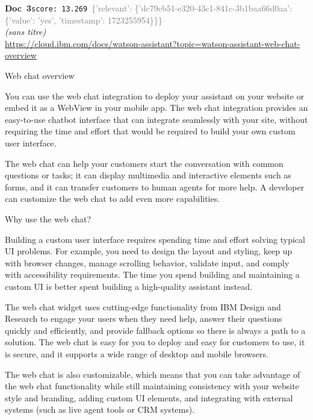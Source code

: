 \documentclass[a4paper,11pt]{article}
\begin{document}
\begin{docenv}
{\footnotesize\textcolor{doccolor}{\textbf{Doc~3}}}\hfill{\tiny\texttt{score:~13.269}}\ {\tiny\textcolor{gray}{\{'relevant': \{'dc79eb51-e320-43c1-841c-3b1baa66d0aa': \{'value': 'yes', 'timestamp': 1723255954\}\}\}}}\\[3pt]
{\small\textit{(sans titre)}}\\[2pt]
{\tiny\url{https://cloud.ibm.com/docs/watson-assistant?topic=watson-assistant-web-chat-overview}}\\[4pt]
{\footnotesize 
Web chat overview 

You can use the web chat integration to deploy your assistant on your website or embed it as a WebView in your mobile app. The web chat integration provides an easy-to-use chatbot interface that can integrate seamlessly with your site, without requiring the time and effort that would be required to build your own custom user interface.

The web chat can help your customers start the conversation with common questions or tasks; it can display multimedia and interactive elements such as forms, and it can transfer customers to human agents for more help. A developer can customize the web chat to add even more capabilities.



 Why use the web chat? 

Building a custom user interface requires spending time and effort solving typical UI problems. For example, you need to design the layout and styling, keep up with browser changes, manage scrolling behavior, validate input, and comply with accessibility requirements. The time you spend building and maintaining a custom UI is better spent building a high-quality assistant instead.

The web chat widget uses cutting-edge functionality from IBM Design and Research to engage your users when they need help, answer their questions quickly and efficiently, and provide fallback options so there is always a path to a solution. The web chat is easy for you to deploy and easy for customers to use, it is secure, and it supports a wide range of desktop and mobile browsers.

The web chat is also customizable, which means that you can take advantage of the web chat functionality while still maintaining consistency with your website style and branding, adding custom UI elements, and integrating with external systems (such as live agent tools or CRM systems).





}
\end{docenv}
\end{document}
